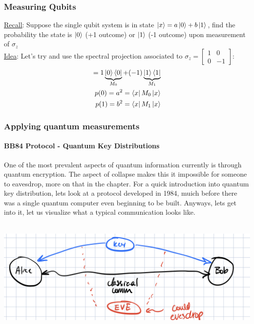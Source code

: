 \documentclass[12pt]{article}
\theoremstyle{plain}
\theoremstyle{nonumberplain}
\theoremstyle{plain}
\theoremstyle{nonumberplain}
\newcommand\1{{\bf 1}}
\newcommand{\bmat}[1]{\begin{bmatrix*} #1 \end{bmatrix*}} %
\newcommand{\<}{\left\langle}
\renewcommand{\>}{\right\rangle}
\begin{document}
\subsubsection{Measuring Qubits}
\underline{Recall}: Suppose the single qubit system is in state $\ket{x} = a\ket{0} + b\ket{1}$, find the probability the state is $\ket{0}$ (+1 outcome) or $\ket{1}$ (-1 outcome) upon measurement of $\sigma_z$\\
\underline{Idea}: Let's try and use the spectral projection associated to $\sigma_z = \bmat{1 &0\\ 0 &-1}$:
\begin{equation}
\begin{split}
= 1\underbrace{\ket{0}\bra{0}}_{M_0} + (-1)\underbrace{\ket{1}\bra{1}}_{M_1}\\
p(0) = a^2 = \bra{x}M_0\ket{x}\\
p(1) = b^2 = \bra{x}M_1\ket{x}\\
\end{split}
\end{equation}

\subsubsection{Applying quantum measurements}
\paragraph{BB84 Protocol - Quantum Key Distributions}
One of the most prevalent aspects of quantum information currently is through quantum encryption.  The aspect of collapse makes this it impossible for someone to eavesdrop, more on that in the chapter.  For a quick introduction into quantum key distribution, lets look at a protocol developed in 1984, muich before there was a single quantum computer even beginning to be built.  Anyways, lets get into it, let us visualize what a typical communication looks like.
\\
\\
\begin{center}
 \includegraphics[scale=.3]{aandb}
\end{center}
\end{document}
